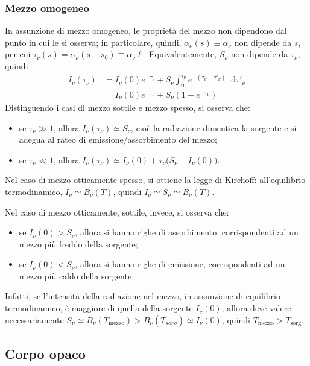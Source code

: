 \documentclass[11pt, a4paper]{scrartcl}
\theoremstyle{style}
\theoremstyle{style1}
\newcommand{\dd}{\mathop{}\!\mathrm{d}}
\numberwithin{equation}{subsection}
\begin{document}
\subsubsection{Mezzo omogeneo}
In assunzione di mezzo omogeneo, le propriet\`a del mezzo non dipendono dal punto in cui le si osserva; in particolare, quindi, $\alpha _\nu (s) \equiv \alpha _\nu $ non dipende da $s$, per cui $\tau _\nu(s) = \alpha _\nu (s-s_0) \equiv \alpha _\nu \ell $.
Equivalentemente, $S_\nu $ non dipende da $\tau _\nu $, quindi
\begin{equation}
	\begin{split}
		I_\nu (\tau _\nu ) &= I_\nu(0) e^{-\tau _\nu } + S_\nu \int _0^{\tau _\nu } e^{-(\tau _\nu -\tau '_\nu )}\dd \tau '_\nu \\
				   &=  I_\nu (0) e^{-\tau _\nu } + S_\nu \left(1-e^{-\tau _\nu }\right) 
	\end{split}
\end{equation}
Distinguendo i casi di mezzo sottile e mezzo spesso, si osserva che:
\begin{itemize}
	\item se $\tau _\nu \gg 1$, allora $I_\nu (\tau _\nu ) \simeq S_\nu $, cio\`e la radiazione dimentica la sorgente e si adegua al rateo di emissione/assorbimento del mezzo;
	\item se $\tau _\nu  \ll 1 $, allora $I_\nu (\tau _\nu ) \simeq I_\nu (0) + \tau _\nu \big( S_\nu - I_\nu (0)\big)$.
\end{itemize}
Nel caso di mezzo otticamente spesso, si ottiene la legge di Kirchoff: all'equilibrio termodinamico, $I_\nu \simeq B_\nu (T)$, quindi $I_\nu \simeq S_\nu \simeq B_\nu (T)$.

Nel caso di mezzo otticamente, sottile, invece, si osserva che:
\begin{itemize}
	\item se $I_\nu (0) > S_\nu $, allora si hanno righe di assorbimento, corrispondenti ad un mezzo pi\`u freddo della sorgente;
	\item se $I_\nu (0) < S_\nu $, allora si hanno righe di emissione, corrispondenti ad un mezzo pi\`u caldo della sorgente.
\end{itemize}
Infatti, se l'intensit\`a della radiazione nel mezzo, in assunzione di equilibrio termodinamico, \`e maggiore di quella della sorgente $I_\nu (0)$, allora deve valere necessariamente $S_\nu \simeq B_\nu (T_\text{mezzo}) > B_\nu (T_{sorg} )\simeq I_\nu (0)$, quindi $T_\text{mezzo} > T_\text{sorg}$.

\subsection{Corpo opaco}
\end{document}
